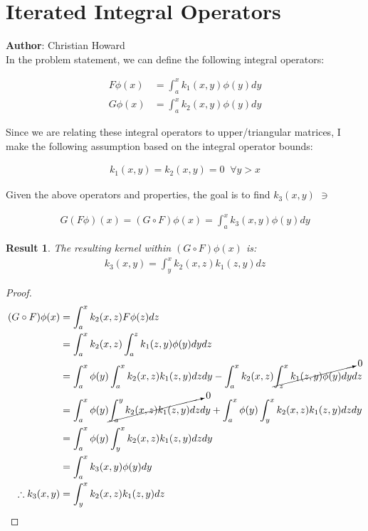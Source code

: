 \documentclass{article}[11pt]
\author{Christian Howard}
\newtheorem{lemma}{Result}[section]
\begin{document}
   
   \section{Iterated Integral Operators}
   \textbf{Author}: Christian Howard \\
   In the problem statement, we can define the following integral operators:
   
   \begin{align}
   F \phi (x) &= \int_a^x k_1(x,y) \phi(y) dy \\
   G \phi (x) &= \int_a^x k_2(x,y) \phi(y) dy 
   \end{align}
   
   Since we are relating these integral operators to upper/triangular matrices, I make the following assumption based on the integral operator bounds:
   
   \begin{align}
   k_1(x,y) = k_2(x,y) = 0 \;\;\forall y > x
   \end{align}
   
   Given the above operators and properties, the goal is to find $k_3(x,y)$ $\ni$
   
   \begin{align}
   G(F\phi)(x) = (G \circ F)\phi(x) = \int_a^x k_3(x,y) \phi(y) dy
   \end{align}
   
   
   \begin{lemma}
   The resulting kernel within $(G \circ F)\phi(x)$ is:
	   \begin{align*}
	   k_3(x,y) = \int_y^x k_2(x,z) k_1(z,y) dz 
	   \end{align*}
   \end{lemma}
   
   \begin{proof}
   \begin{align*}
   (G \circ F)\phi(x) &= \int_a^x k_2(x,z) F\phi(z) dz \\
   &= \int_a^x k_2(x,z) \int_a^z k_1(z,y) \phi(y) dy dz \\
   &= \int_a^x \phi(y) \int_a^x k_2(x,z) k_1(z,y)  dz dy - \int_a^x k_2(x,z) \cancelto{0}{\int_z^x k_1(z,y) \phi(y) dy} dz \\
   &= \int_a^x \phi(y) \cancelto{0}{\int_a^y k_2(x,z) k_1(z,y)  dz} dy + \int_a^x \phi(y) \int_y^x k_2(x,z) k_1(z,y)  dz dy \\
   &=  \int_a^x \phi(y) \int_y^x k_2(x,z) k_1(z,y)  dz dy \\
   &=  \int_a^x k_3(x,y) \phi(y) dy \\
   \therefore k_3(x,y) &= \int_y^x k_2(x,z) k_1(z,y) dz
   \end{align*}
   \end{proof}
   
\end{document}
